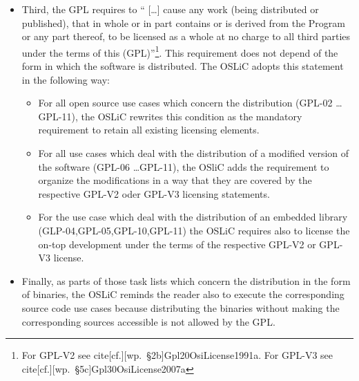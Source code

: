 \begin{itemize}
\begin{itemize}
    \item Third, the GPL requires to \enquote{ [\ldots] cause any work (being
    distributed or published), that in whole or in part contains or is derived
    from the Program or any part thereof, to be licensed as a whole at no charge
    to all third parties under the terms of this (GPL)}\footnote{For GPL-V2 see
    cite[cf.][\nopage wp.\ §2b]{Gpl20OsiLicense1991a}. For GPL-V3 see
    cite[cf.][\nopage wp.\ §5c]{Gpl30OsiLicense2007a}}. This requirement does
    not depend of the form in which the software is distributed. The OSLiC
    adopts this statement in the following way:
    \begin{itemize}
      \item For all open source use cases which concern the distribution (GPL-02
      \ldots GPL-11), the OSLiC rewrites this condition as the mandatory
      requirement to retain all existing licensing elements.
      
      \item For all use cases which deal with the distribution of a modified
      version of the software (GPL-06 \ldots GPL-11), the OSliC adds the
      requirement to organize the modifications in a way that they are covered
      by the respective GPL-V2 oder GPL-V3 licensing statements.
      
      \item For the use case which deal with the distribution of an embedded
      library (GLP-04,GPL-05,GPL-10,GPL-11) the OSLiC requires also to license
      the on-top development under the terms of the respective GPL-V2 or GPL-V3
      license.
    \end{itemize}
   
    \item Finally, as parts of those task lists which concern the distribution
    in the form of binaries, the OSLiC reminds the reader also to execute the
    corresponding source code use cases because distributing the binaries
    without making the corresponding sources accessible is not allowed by the
    GPL.
  \end{itemize}
  

\end{itemize}





%
